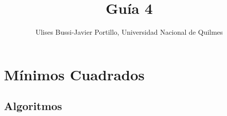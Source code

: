 \documentclass[a4paper,11pt]{article}
\makeatletter
\theoremstyle{mytheor}
\renewcommand{\maketitle}{
\colorbox{gray!20}{\framebox[\linewidth]{ \huge \textsc{\@title} } 
\lfoot{\@title}
}

}
\makeatother
\begin{document}
\title{Guía 4}

\author{Ulises Bussi-Javier Portillo, Universidad Nacional de Quilmes}


\maketitle \vspace{20pt}

\section*{Mínimos Cuadrados}
%

\subsection*{Algoritmos}
\end{document}
